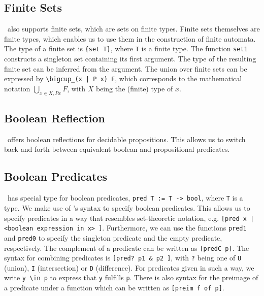 \subsection{Finite Sets}
\ssreflect\ also supports finite sets, which are sets on finite types.
Finite sets themselves are finite types, which enables us to use them in the construction of finite automata.
The type of a finite set is \lstinline!{set T}!, where \lstinline{T} is a finite type.
The function \lstinline{set1} constructs a singleton set containing its first argument. 
The type of the resulting finite set can be inferred from the argument. 
The union over finite sets can be expressed by \lstinline{\bigcup_(x | P x) F}, 
which corresponds to the mathematical notation $\bigcup_{x \in X, P x} F$, with $X$ being the (finite) type of $x$.


\subsection{Boolean Reflection}
\ssreflect\ offers boolean reflections for decidable propositions. 
This allows us to switch back and forth between equivalent boolean and propositional predicates.

\subsection{Boolean Predicates}
\ssreflect\ has special type for boolean predicates, \lstinline{pred T := T -> bool}, where \lstinline{T} is a type.
We make use of \ssreflect's syntax to specify boolean predicates.
This allows us to specify predicates in a way that resembles set-theoretic notation, e.g. 
\lstinline{[pred x | <boolean expression in x> ]}.
Furthermore, we can use the functions \lstinline{pred1} and \lstinline{pred0} to specify the singleton predicate and the empty predicate, respectively.
The complement of a predicate can be written as \lstinline{[predC p]}. 
The syntax for combining predicates is \lstinline{[pred? p1 & p2 ]}, with \lstinline{?} being one of 
\lstinline{U} (union), \lstinline{I} (intersection) or \lstinline{D} (difference).
For predicates given in such a way, we write \lstinline{y \in p} to express that \lstinline{y} fulfills \lstinline{p}.
There is also syntax for the preimage of a predicate under a function
which can be written as \lstinline{[preim f of p]}.



